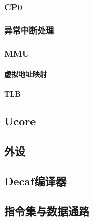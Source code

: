 \subsubsection{CP0}
\subsubsection{异常中断处理}
\subsubsection{MMU}
\paragraph{虚拟地址映射}
\paragraph{TLB}
\subsection{Ucore}
\subsection{外设}
\subsection{Decaf编译器}
\subsection{指令集与数据通路}
